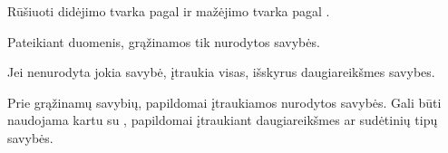 \documentclass[letterpaper,10pt,lithuanian]{sphinxmanual}
\begin{document}
\begin{fulllineitems}
\begin{fulllineitems}
\label{\detokenize{formules:sort}}
\pysigstartsignatures
\pysiglinewithargsret
{}
{\sphinxparamcomma {}}
{}
\pysigstopsignatures
\sphinxAtStartPar
Rūšiuoti didėjimo tvarka  pagal  ir mažėjimo tvarka pagal .

\end{fulllineitems}


\begin{fulllineitems}
\label{\detokenize{formules:select}}
\pysigstartsignatures
\pysiglinewithargsret
{}
{}
{}
\pysigstopsignatures
\sphinxAtStartPar
Pateikiant duomenis, grąžinamos tik nurodytos savybės.

\sphinxAtStartPar
Jei nenurodyta jokia savybė, įtraukia visas, išskyrus daugiareikšmes
savybes.

\end{fulllineitems}


\begin{fulllineitems}
\label{\detokenize{formules:include}}
\pysigstartsignatures
\pysiglinewithargsret
{}
{}
{}
\pysigstopsignatures
\sphinxAtStartPar
Prie grąžinamų savybių, papildomai įtraukiamos nurodytos savybės. Gali
būti naudojama kartu su , papildomai įtraukiant
daugiareikšmes ar sudėtinių tipų savybės.

\end{fulllineitems}



\end{fulllineitems}
\end{document}

